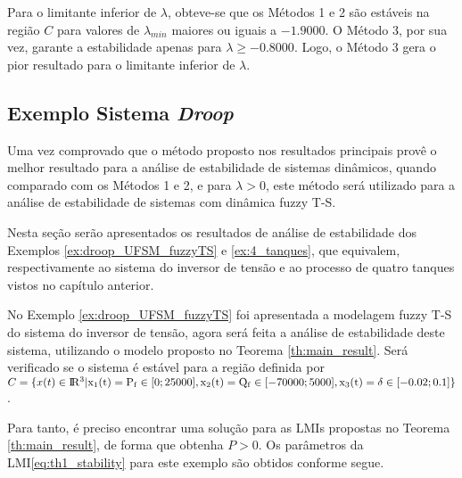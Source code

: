 Para o limitante inferior de $\lambda$, obteve-se que os Métodos 1 e 2 são estáveis na região $C$ para valores de $\lambda_{min}$ maiores ou iguais a $-1.9000$. O Método 3, por sua vez, garante a estabilidade apenas para $\lambda \geq -0.8000$. Logo, o Método 3 gera o pior resultado para o limitante inferior de $\lambda$.

\subsection{Exemplo Sistema {\it Droop}}

Uma vez comprovado que o método proposto nos resultados principais provê o melhor resultado para a análise de estabilidade de sistemas dinâmicos, quando comparado com os Métodos 1 e 2, e para $\lambda > 0$, este método será utilizado para a análise de estabilidade de sistemas com dinâmica fuzzy T-S.

Nesta seção serão apresentados os resultados de análise de estabilidade dos Exemplos \ref{ex:droop_UFSM_fuzzyTS} e \ref{ex:4_tanques}, que equivalem, respectivamente ao sistema do inversor de tensão e ao processo de quatro tanques vistos no capítulo anterior.

\begin{example} \label{ex:estab_sist_droop}
No Exemplo \ref{ex:droop_UFSM_fuzzyTS} foi apresentada a modelagem fuzzy T-S do sistema do inversor de tensão, agora será feita a análise de estabilidade deste sistema, utilizando o modelo proposto no Teorema \ref{th:main_result}. Será verificado se o sistema é estável para a região definida por $C = \{x(t) \in \rm I\!R^3 | x_1(t) = P_f \in [0; 25000], x_2(t) = Q_f \in [-70000; 5000], x_3(t) = \delta \in [-0.02; 0.1]\}$.
\end{example}

Para tanto, é preciso encontrar uma solução para as LMIs propostas no Teorema \ref{th:main_result}, de forma que obtenha $P > 0$. Os parâmetros da LMI\ref{eq:th1_stability} para este exemplo são obtidos conforme segue.


